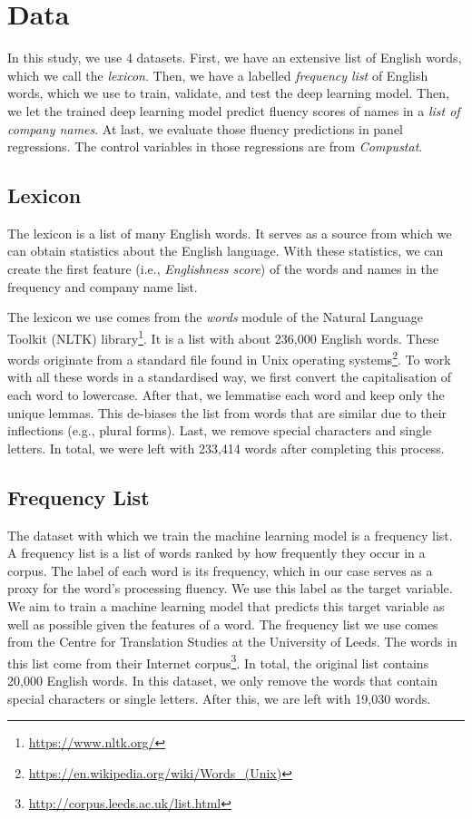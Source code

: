 \documentclass[11pt]{article}
\begin{document}
\newpage
\section{Data}
In this study, we use 4 datasets. First, we have an extensive list of English words, which we call the \textit{lexicon}. Then, we have a labelled \textit{frequency list} of English words, which we use to train, validate, and test the deep learning model. Then, we let the trained deep learning model predict fluency scores of names in a \textit{list of company names}. At last, we evaluate those fluency predictions in panel regressions. The control variables in those regressions are from \textit{Compustat}. 


\subsection{Lexicon} \label{Lexicon}
The lexicon is a list of many English words. It serves as a source from which we can obtain statistics about the English language. With these statistics, we can create the first feature (i.e., \textit{Englishness score}) of the words and names in the frequency and company name list.

The lexicon we use comes from the \textit{words} module of the Natural Language Toolkit (NLTK) library\footnote{\url{https://www.nltk.org/}}. It is a list with about 236,000  English words. These words originate from a standard file found in Unix operating systems\footnote{\url{https://en.wikipedia.org/wiki/Words_(Unix)}}. To work with all these words in a standardised way, we first convert the capitalisation of each word to lowercase. After that, we lemmatise each word and keep only the unique lemmas. This de-biases the list from words that are similar due to their inflections (e.g., plural forms).
Last, we remove special characters and single letters. In total, we were left with 233,414 words after completing this process.



\subsection{Frequency List} \label{Training set}
The dataset with which we train the machine learning model is a frequency list. A frequency list is a list of words ranked by how frequently they occur in a corpus. The label of each word is its frequency, which in our case serves as a proxy for the word's processing fluency. We use this label as the target variable.  We aim to train a machine learning model that predicts this target variable as well as possible given the features of a word. The frequency list we use comes from the Centre for Translation Studies at the University of Leeds. The words in this list come from their Internet corpus\footnote{\url{http://corpus.leeds.ac.uk/list.html}}. In total, the original list contains 20,000 English words. In this dataset, we only remove the words that contain special characters or single letters. After this, we are left with 19,030 words. 
\end{document}
